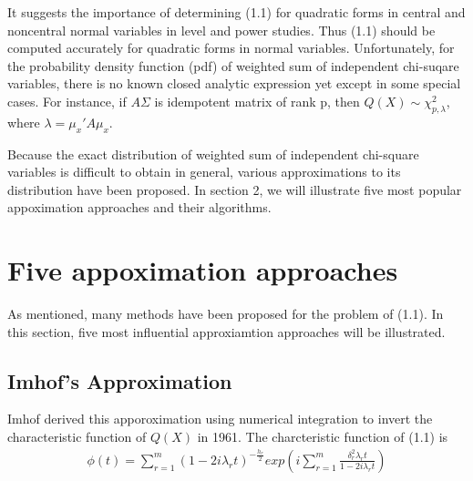 \documentclass[paper=a4]{article}
\numberwithin{equation}{section}
\begin{document}
It suggests the importance of determining (1.1) for quadratic forms in central and noncentral
normal variables in level and power studies. Thus (1.1) should be computed accurately
for quadratic forms in normal variables.
Unfortunately, for the probability density function (pdf) of weighted sum of independent chi-suqare variables, there is no known closed analytic expression yet except in some special cases. For instance, if $A\Sigma$ is idempotent matrix of rank p, then $Q(X)\sim \chi_{p,
	\lambda}^2$, where  $\lambda={{\mu_x}'}A\mu_x$.

Because the exact distribution of weighted sum of independent chi-square variables is difficult to obtain in general, various approximations to its distribution have been proposed. In section 2, we will illustrate five most popular appoximation approaches and their algorithms.

\section{Five appoximation approaches}
As mentioned, many methods have been proposed for the problem of (1.1). In this section, five most influential approxiamtion approaches will be illustrated.

\subsection{Imhof's Approximation}
Imhof derived this apporoximation using numerical integration to invert the characteristic function of $Q(X)$ in 1961. The charcteristic function of (1.1) is 
\begin{align}
\phi(t)=\sum_{r=1}^m(1-2i\lambda_rt)^{-\frac{h_r}{2}}exp(i\sum_{r=1}^m\frac{\delta_r^2\lambda_rt}{1-2i\lambda_rt})
\end{align}
\end{document}
